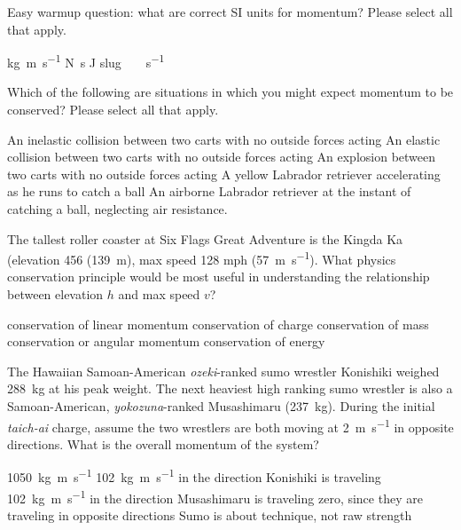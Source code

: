 \documentclass[exam,addpoints, noanswers]{exam}
\begin{document}
\begin{questions}
\question[5] Easy warmup question: what are correct SI units for momentum? Please select all that apply. 
\begin{choices}
\CorrectChoice \si{\kilo\gram\meter\per\second}
\CorrectChoice \si{\newton\second}
\choice \si{\joule}
\choice \si{slug\ \foot\per\second}
\end{choices}

\question[5] Which of the following are situations in which you might expect momentum to be conserved? Please select all that apply. 
\begin{choices}
\CorrectChoice An inelastic collision between two carts with no outside forces acting
\CorrectChoice An elastic collision between two carts with no outside forces acting
\CorrectChoice An explosion between two carts with no outside forces acting
\choice A yellow Labrador retriever accelerating as he runs to catch a ball
\CorrectChoice An airborne Labrador retriever at the instant of catching a ball, neglecting air resistance. 
\end{choices}

\question[5] The tallest roller coaster at Six Flags Great Adventure is the Kingda Ka (elevation \SI{456}{\foot} (\SI{139}{\meter}), max speed 128 mph (\SI{57}{\meter\per\second}). What physics conservation principle would be most useful in understanding the relationship between elevation $h$ and max speed $v$?
\begin{choices}
\choice conservation of linear momentum
\choice conservation of charge
\choice conservation of mass
\choice conservation or angular momentum
\CorrectChoice conservation of energy
\end{choices}

\question[5] The Hawaiian Samoan-American \emph{ozeki}-ranked sumo wrestler Konishiki weighed \SI{288}{\kilo\gram} at his peak weight. The next heaviest high ranking sumo wrestler is also a Samoan-American, \emph{yokozuna}-ranked Musashimaru (\SI{237}{\kilo\gram}). During the initial \emph{taich-ai} charge, assume the two wrestlers are both moving at \SI{2}{\meter\per\second} in opposite directions. What is the overall momentum of the system?
\begin{choices}
\choice \SI{1050}{\kilo\gram\meter\per\second}
\CorrectChoice \SI{102}{\kilo\gram\meter\per\second} in the direction Konishiki is traveling
\choice \SI{102}{\kilo\gram\meter\per\second} in the direction Musashimaru is traveling
\choice zero, since they are traveling in opposite directions
\choice Sumo is about technique, not raw strength
\end{choices}


\end{questions}
\end{document}
